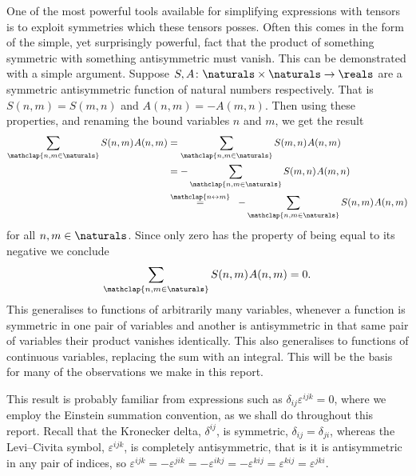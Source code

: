 \documentclass[fleqn]{NotesClass}
\begin{document}
    One of the most powerful tools available for simplifying expressions with tensors is to exploit symmetries which these tensors posses.
    Often this comes in the form of the simple, yet surprisingly powerful, fact that the product of something symmetric with something antisymmetric must vanish.
    This can be demonstrated with a simple argument.
    Suppose \(S, A \colon \naturals \times \naturals \to \reals\) are a symmetric antisymmetric function of natural numbers respectively.
    That is \(S(n, m) = S(m, n)\) and \(A(n, m) = -A(m, n)\).
    Then using these properties, and renaming the bound variables \(n\) and \(m\), we get the result
    \begin{alignat}{3}
        \sum_{\mathclap{n, m \in \naturals}} S(n, m)\mkern1muA(n, m) &= \sum_{\mathclap{n, m \in \naturals}} S(m, n)\mkern1muA(n, m)\\
        &= -\sum_{\mathclap{n, m \in \naturals}} S(m, n)\mkern1muA(m, n)\\
        &\overset{\mathclap{n \leftrightarrow m}}{=} \mkern10mu -\sum_{\mathclap{n, m \in \naturals}} S(n, m)\mkern1muA(n, m)
    \end{alignat}
    for all \(n, m \in \naturals\).
    Since only zero has the property of being equal to its negative we conclude
    \begin{equation}
        \sum_{\mathclap{n,m\in\naturals}} S(n, m)\mkern1mu A(n, m) = 0.
    \end{equation}
    This generalises to functions of arbitrarily many variables, whenever a function is symmetric in one pair of variables and another is antisymmetric in that same pair of variables their product vanishes identically.
    This also generalises to functions of continuous variables, replacing the sum with an integral.
    This will be the basis for many of the observations we make in this report.
    
    This result is probably familiar from expressions such as \(\delta_{ij}\varepsilon^{ijk} = 0\), where we employ the Einstein summation convention, as we shall do throughout this report.
    Recall that the Kronecker delta, \(\delta^{ij}\), is symmetric, \(\delta_{ij} = \delta_{ji}\), whereas the Levi--Civita symbol, \(\varepsilon^{ijk}\), is completely antisymmetric, that is it is antisymmetric in any pair of indices, so \(\varepsilon^{ijk} = -\varepsilon^{jik} = -\varepsilon^{ikj} = -\varepsilon^{kij} = \varepsilon^{kij} = \varepsilon^{jki}\).
    
\end{document}
